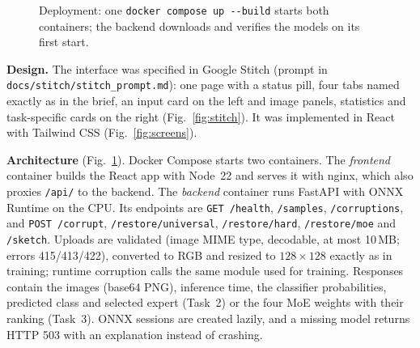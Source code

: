 \documentclass[conference]{IEEEtran}
\begin{document}
\begin{figure}[!htbp]
\centering
{}
\caption{Deployment: one \texttt{docker compose up -{}-build} starts both containers; the backend downloads and verifies
the models on its first start.}\label{fig:arch-app}
\end{figure}

\textbf{Design.} The interface was specified in Google Stitch (prompt in \texttt{docs/stitch/stitch\_prompt.md}):
one page with a status pill, four tabs named exactly as in the brief, an input card on the left and image panels,
statistics and task-specific cards on the right (Fig.~\ref{fig:stitch}). It was implemented in React with Tailwind
CSS (Fig.~\ref{fig:screens}).

\textbf{Architecture} (Fig.~\ref{fig:arch-app}). Docker Compose starts two containers. The \emph{frontend} container
builds the React app with Node~22 and serves it with nginx, which also proxies \texttt{/api/} to the backend. The
\emph{backend} container runs FastAPI with ONNX Runtime on the CPU. Its endpoints are \texttt{GET /health},
\texttt{/samples}, \texttt{/corruptions}, and \texttt{POST /corrupt}, \texttt{/restore/universal},
\texttt{/restore/hard}, \texttt{/restore/moe} and \texttt{/sketch}. Uploads are validated (image MIME type, decodable,
at most 10\,MB; errors 415/413/422), converted to RGB and resized to $128\times128$ exactly as in training; runtime
corruption calls the same module used for training. Responses contain the images (base64 PNG), inference time, the
classifier probabilities, predicted class and selected expert (Task~2) or the four MoE weights with their ranking
(Task~3). ONNX sessions are created lazily, and a missing model returns HTTP 503 with an explanation instead of
crashing.
\end{document}
